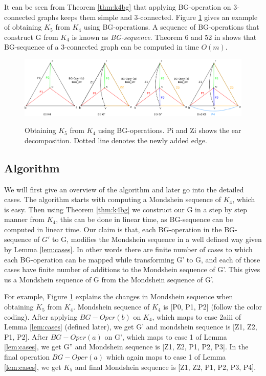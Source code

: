It can be seen from Theorem \ref{thm:k4bg} that applying BG-operation on 3-connected graphs keeps them simple and 3-connected.
Figure \ref{fig:bgEg} gives an example of obtaining $K_5$ from $K_4$ using BG-operations.
A sequence of BG-operations that construct G from $K_4$ is known as \textit{BG-sequence}.
Theorem 6 and 52 in \cite{bgLinear} shows that BG-sequence of a 3-connected graph can be computed in time $O(m)$.
\begin{figure}
    \centering 
    \includegraphics[scale=0.27]{bgEg.png} \\ 
    \caption{Obtaining $K_5$ from $K_4$ using BG-operations. Pi and Zi shows the ear decomposition. Dotted line denotes the newly added edge.}
    \label{fig:bgEg}
\end{figure}



\subsection{Algorithm}
We will first give an overview of the algorithm and later go into the detailed cases.
The algorithm starts with computing a Mondshein sequence of $K_4$, which is easy.
Then using Theorem \ref{thm:k4bg} we construct our G in a step by step manner from $K_4$, this can be done in linear time, as BG-sequence can be computed in linear time.
Our claim is that, each BG-operation in the BG-sequence of $G'$ to G, modifies the Mondshein sequence in a well defined way given by Lemma \ref{lem:cases}.
In other words there are finite number of cases to which each BG-operation can be mapped while transforming G' to G, and each of those cases have finite number of additions to the Mondshein sequence of G'.
This gives us a Mondshein sequence of G from the Mondshein sequence of G'.

\begin{exmp}
For example, Figure \ref{fig:bgEg} explains the changes in Mondshein sequence when obtaining $K_5$ from $K_4$.
Mondshein sequence of $K_4$ is [P0, P1, P2] (follow the color coding).
After applying $BG-Oper(b)$ on $K_4$, which maps to case 2aiii of Lemma \ref{lem:cases} (defined later), we get G' and mondshein sequence is [Z1, Z2, P1, P2].
After $BG-Oper(a)$ on G', which maps to case 1 of Lemma \ref{lem:cases}, we get G'' and Mondshein sequence is [Z1, Z2, P1, P2, P3].
In the final operation $BG-Oper(a)$ which again maps to case 1 of Lemma \ref{lem:cases}, we get $K_5$ and final Mondshein sequence is [Z1, Z2, P1, P2, P3, P4].
\end{exmp}

